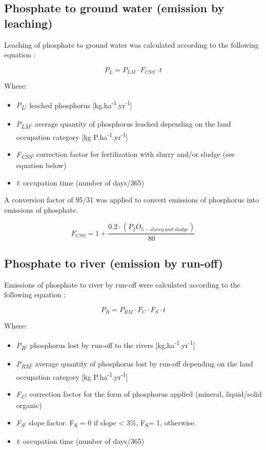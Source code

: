 \documentclass[openany]{book}
\begin{document}
\hypertarget{phosphate-to-ground-water-emission-by-leaching}{%
\subsection{Phosphate to ground water (emission by leaching)}\label{phosphate-to-ground-water-emission-by-leaching}}

Leaching of phosphate to ground water was calculated according to the following equation \citep{prasuhn2006}:

\[P_L=P_{LM} \cdot F_{CSS} \cdot t\]

Where:

\begin{itemize}
\item
  \emph{P\textsubscript{L}}: leached phosphorus {[}kg.ha\textsuperscript{-1}.yr\textsuperscript{-1}{]}
\item
  \emph{P\textsubscript{LM}}: average quantity of phosphorus leached depending on the land occupation category {[}kg P.ha\textsuperscript{-1}.yr\textsuperscript{-1}{]}
\item
  \emph{F\textsubscript{CSS}}: correction factor for fertilization with slurry and/or sludge (see equation below)
\item
  \emph{t}: occupation time (number of days/365)
\end{itemize}

A conversion factor of 95/31 was applied to convert emissions of phosphorus into emissions of phosphate.

\[F_{CSS}=1+ \frac{0.2 \cdot (P_2O_{5-slurry\: and\: sludge})}{80}\]

\hypertarget{phosphate-to-river-emission-by-run-off}{%
\subsection{Phosphate to river (emission by run-off)}\label{phosphate-to-river-emission-by-run-off}}

Emissions of phosphate to river by run-off were calculated according to the following equation \citep{prasuhn2006}:

\[P_R=P_{RM} \cdot F_C \cdot F_S \cdot t\]

Where:

\begin{itemize}
\item
  \emph{P\textsubscript{R}}: phosphorus lost by run-off to the rivers {[}kg.ha\textsuperscript{-1}.yr\textsuperscript{-1}{]}
\item
  \emph{P\textsubscript{RM}}: average quantity of phosphorus lost by run-off depending on the land occupation category {[}kg P.ha\textsuperscript{-1}.yr\textsuperscript{-1}{]}
\item
  \emph{F\textsubscript{C}}: correction factor for the form of phosphorus applied (mineral, liquid/solid organic)
\item
  \emph{F\textsubscript{S}}: slope factor. F\textsubscript{S} = 0 if slope \textless{} 3\%, F\textsubscript{S}= 1, otherwise.
\item
  \emph{t}: occupation time (number of days/365)
\end{itemize}
\end{document}
